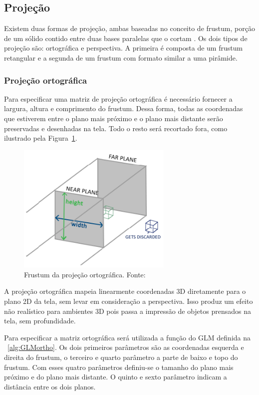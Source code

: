 \documentclass[12pt, 
openright, 
oneside, 
a4paper,    
brazil]{facom-ufu-abntex2}
\begin{document}
\subsection{Projeção}

Existem duas formas de projeção, ambas baseadas no conceito de frustum, porção de um sólido contido entre duas bases paralelas que o cortam \cite{Frustum}. Os dois tipos de projeção são: ortográfica e perspectiva. A primeira é composta de um frustum retangular e a segunda de um frustum com formato similar a uma pirâmide.

\subsubsection{Projeção ortográfica}

Para especificar uma matriz de projeção ortográfica é necessário fornecer a largura, altura e comprimento do frustum. Dessa forma, todas as coordenadas que estiverem entre o plano mais próximo e o plano mais distante serão preservadas e desenhadas na tela. Todo o resto será recortado fora, como ilustrado pela Figura~\ref{fig:orthographicProjection}.

\begin{figure}[H]
	\centering
	\includegraphics[width=20em]{imagens/orthographicProjection.png}
	\caption{Frustum da projeção ortográfica. Fonte:~\cite{LearnOpenGL}}
	\label{fig:orthographicProjection}
\end{figure}

A projeção ortográfica mapeia linearmente coordenadas 3D diretamente para o plano 2D da tela, sem levar em consideração a perspectiva. Isso produz um efeito não realístico para ambientes 3D pois passa a impressão de objetos prensados na tela, sem profundidade.

Para especificar a matriz ortográfica será utilizada a função do GLM definida na \lstlistingname~\ref{alg:GLMortho}. Os dois primeiros parâmetros são as coordenadas esquerda e direita do frustum, o terceiro e quarto parâmetro a parte de baixo e topo do frustum. Com esses quatro parâmetros definiu-se o tamanho do plano mais próximo e do plano mais distante. O quinto e sexto parâmetro indicam a distância entre os dois planos.
\end{document}
